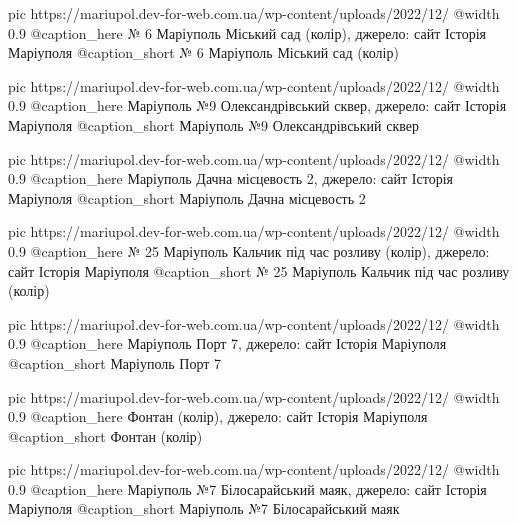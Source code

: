   pic https://mariupol.dev-for-web.com.ua/wp-content/uploads/2022/12/%
  @width 0.9
  @caption_here № 6 Маріуполь Міський сад (колір), джерело: сайт Історія Маріуполя
  @caption_short № 6 Маріуполь Міський сад (колір)

  pic https://mariupol.dev-for-web.com.ua/wp-content/uploads/2022/12/%
  @width 0.9
  @caption_here Маріуполь №9 Олександрівський сквер, джерело: сайт Історія Маріуполя
  @caption_short Маріуполь №9 Олександрівський сквер

  pic https://mariupol.dev-for-web.com.ua/wp-content/uploads/2022/12/%
  @width 0.9
  @caption_here Маріуполь Дачна місцевость 2, джерело: сайт Історія Маріуполя
  @caption_short Маріуполь Дачна місцевость 2

  pic https://mariupol.dev-for-web.com.ua/wp-content/uploads/2022/12/%
  @width 0.9
  @caption_here № 25 Маріуполь Кальчик під час розливу (колір), джерело: сайт Історія Маріуполя
  @caption_short № 25 Маріуполь Кальчик під час розливу (колір)

  pic https://mariupol.dev-for-web.com.ua/wp-content/uploads/2022/12/%
  @width 0.9
  @caption_here Маріуполь Порт 7, джерело: сайт Історія Маріуполя
  @caption_short Маріуполь Порт 7

  pic https://mariupol.dev-for-web.com.ua/wp-content/uploads/2022/12/%
  @width 0.9
  @caption_here Фонтан (колір), джерело: сайт Історія Маріуполя
  @caption_short Фонтан (колір)

  pic https://mariupol.dev-for-web.com.ua/wp-content/uploads/2022/12/%
  @width 0.9
  @caption_here Маріуполь №7 Білосарайський маяк, джерело: сайт Історія Маріуполя
  @caption_short Маріуполь №7 Білосарайський маяк

